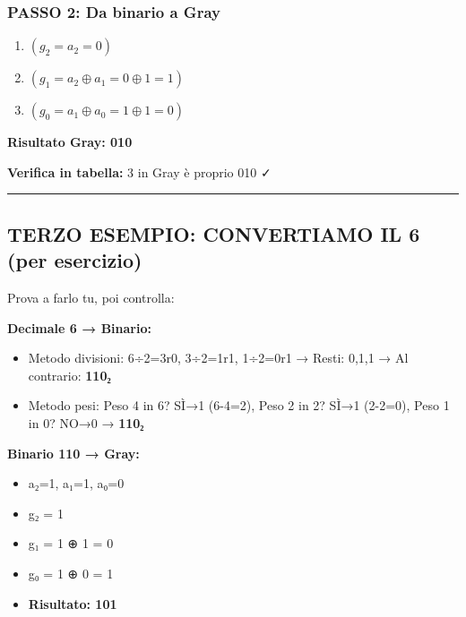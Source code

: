 \documentclass[
]{article}
\providecommand{\tightlist}{%
  \setlength{\itemsep}{0pt}\setlength{\parskip}{0pt}}
\begin{document}
\hypertarget{passo-2-da-binario-a-gray}{%
\subsubsection{\texorpdfstring{\textbf{PASSO 2: Da binario a Gray}}{PASSO 2: Da binario a Gray}}\label{passo-2-da-binario-a-gray}}

\begin{enumerate}
\def\labelenumi{\arabic{enumi}.}
\tightlist
\item
  \(( g_2 = a_2 = 0 )\)
\item
  \(( g_1 = a_2 ⊕ a_1 = 0 ⊕ 1 = 1 )\)
\item
  \(( g_0 = a_1 ⊕ a_0 = 1 ⊕ 1 = 0 )\)
\end{enumerate}

\textbf{Risultato Gray: 010}

\textbf{Verifica in tabella:} 3 in Gray è proprio 010 ✓

\begin{center}\rule{0.5\linewidth}{0.5pt}\end{center}

\hypertarget{terzo-esempio-convertiamo-il-6-per-esercizio}{%
\subsection{\texorpdfstring{\textbf{TERZO ESEMPIO: CONVERTIAMO IL 6 (per esercizio)}}{TERZO ESEMPIO: CONVERTIAMO IL 6 (per esercizio)}}\label{terzo-esempio-convertiamo-il-6-per-esercizio}}

Prova a farlo tu, poi controlla:

\textbf{Decimale 6 → Binario:}

\begin{itemize}
\tightlist
\item
  Metodo divisioni: 6÷2=3r0, 3÷2=1r1, 1÷2=0r1 → Resti: 0,1,1 → Al contrario: \textbf{110₂}
\item
  Metodo pesi: Peso 4 in 6? SÌ→1 (6-4=2), Peso 2 in 2? SÌ→1 (2-2=0), Peso 1 in 0? NO→0 → \textbf{110₂}
\end{itemize}

\textbf{Binario 110 → Gray:}

\begin{itemize}
\tightlist
\item
  a₂=1, a₁=1, a₀=0
\item
  g₂ = 1
\item
  g₁ = 1 ⊕ 1 = 0
\item
  g₀ = 1 ⊕ 0 = 1
\item
  \textbf{Risultato: 101}
\end{itemize}
\end{document}
